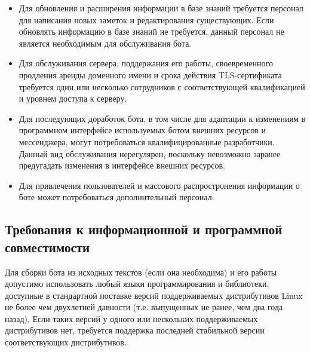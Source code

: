     \begin{itemize}
        \item
            Для обновления и расширения информации в базе знаний требуется персонал для
            написания новых заметок и редактирования существующих. Если обновлять информацию
            в базе знаний не требуется, данный персонал не является необходимым для обслуживания бота.
        \item
            Для обслуживания сервера, поддержания его работы, своевременного продления аренды доменного имени
            и срока действия TLS-сертификата требуется один или несколько сотрудников с соответствующей
            квалификацией и уровнем доступа к серверу.
        \item
            Для последующих доработок бота, в том числе для адаптации к изменениям в программном интерфейсе
            используемых ботом внешних ресурсов и мессенджера, могут потребоваться квалифицированные
            разработчики. Данный вид обслуживания нерегулярен, поскольку невозможно заранее предугадать
            изменения в интерфейсе внешних ресурсов.
        \item
            Для привлечения пользователей и массового распростронения информации о боте может
            потребоваться дополнительный персонал.
    \end{itemize}

\subsection{Требования к информационной и программной совместимости}
    \label{sec:req:compat}
    Для сборки бота из исходных текстов (если она необходима) и его работы допустимо использовать
    любый языки программирования и библиотеки, доступные в стандартной поставке версий поддерживаемых
    дистрибутивов Linux не более чем двухлетней давности (т.е. выпущенных не ранее, чем два
    года назад). Если таких версий у одного или нескольких поддерживаемых дистрибутивов нет,
    требуется поддержка последней стабильной версии соответствующих дистрибутивов.

